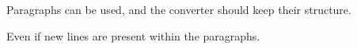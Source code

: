Paragraphs can be used, and the converter should keep their structure.

Even if new lines
are present within the paragraphs.